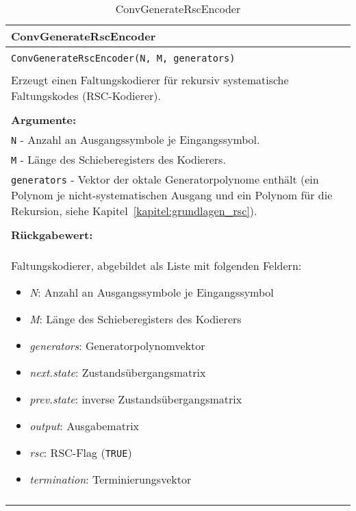 \begin{longtable}{|p{\textwidth}|}
\hline
\rowcolor{lightblue}
ConvGenerateRscEncoder
\\
\hline
\\
\texttt{ConvGenerateRscEncoder(N, M, generators)}\\
\\
Erzeugt einen Faltungskodierer für rekursiv systematische Faltungskodes (RSC-Kodierer).\\
\\
\textbf{Argumente:}\\
\texttt{N} - Anzahl an Ausgangssymbole je Eingangssymbol.\\
\texttt{M} - Länge des Schieberegisters des Kodierers.\\
\texttt{generators} - Vektor der oktale Generatorpolynome enthält (ein Polynom je nicht-systematischen Ausgang und ein Polynom für die Rekursion, siehe Kapitel~\ref{kapitel:grundlagen_rsc}).\\
\\
\textbf{Rückgabewert:}\\
Faltungskodierer, abgebildet als Liste mit folgenden Feldern:
\vspace{-4mm}
\begin{itemize}
\renewcommand\labelitemi{--}
\itemsep-.5em %
\item \emph{N}: Anzahl an Ausgangssymbole je Eingangssymbol
\item \emph{M}: Länge des Schieberegisters des Kodierers
\item \emph{generators}: Generatorpolynomvektor
\item \emph{next.state}: Zustandsübergangsmatrix
\item \emph{prev.state}: inverse Zustandsübergangsmatrix
\item \emph{output}: Ausgabematrix
\item \emph{rsc}: RSC-Flag (\texttt{TRUE})
\item \emph{termination}: Terminierungsvektor
\end{itemize}
\\
\hline
\caption{ConvGenerateRscEncoder}
\label{funktion:ConvGenerateRscEncoder}
\end{longtable}